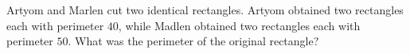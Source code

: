 Artyom and Marlen cut two identical rectangles. Artyom obtained two rectangles each with perimeter $40$, while Madlen obtained two rectangles each with perimeter $50$. What was the perimeter of the original rectangle?
